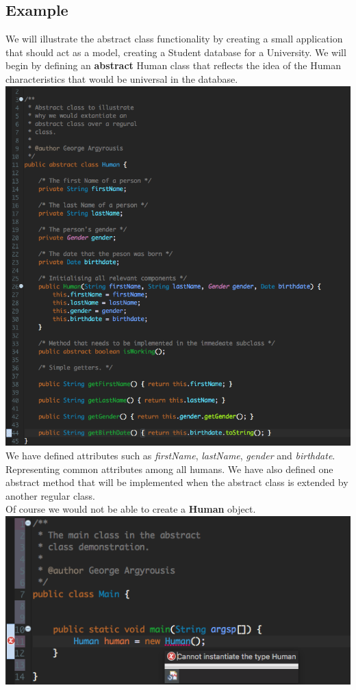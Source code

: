 \documentclass{article}
\begin{document}
\subsection{Example}
We will illustrate the abstract class functionality by creating a small application that should act as a model, creating a Student database for a University. We will begin by defining an \textbf{abstract} Human class that reflects the idea of the Human characteristics that would be universal in the database.\\
\includegraphics[scale=0.48]{images/Human.png}\\
We have defined attributes such as \textit{firstName}, \textit{lastName}, \textit{gender} and \textit{birthdate}. Representing common attributes among all humans. We have also defined one abstract method that will be implemented when the abstract class is extended by another regular class.\\
Of course we would not be able to create a \textbf{Human} object.\\
\includegraphics[scale=0.7]{images/Main_error.png}\\
\end{document}
